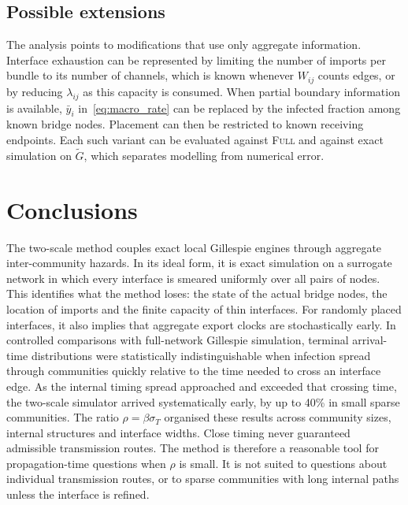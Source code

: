 \documentclass[a4paper,fleqn]{cas-sc}
\newcommand{\ibar}{\bar{y}}
\newcommand{\Full}{\textup{\textsc{Full}}}
\begin{document}
\subsection{Possible extensions}

The analysis points to modifications that use only aggregate information. Interface exhaustion can be represented by limiting the number of imports per bundle to its number of channels, which is known whenever $W_{ij}$ counts edges, or by reducing $\lambda_{ij}$ as this capacity is consumed. When partial boundary information is available, $\ibar_i$ in~\eqref{eq:macro_rate} can be replaced by the infected fraction among known bridge nodes. Placement can then be restricted to known receiving endpoints. Each such variant can be evaluated against \Full{} and against exact simulation on $\tilde G$, which separates modelling from numerical error.

\clearpage
\section{Conclusions}
\label{sec:conclusions}

The two-scale method couples exact local Gillespie engines through aggregate inter-community hazards. In its ideal form, it is exact simulation on a surrogate network in which every interface is smeared uniformly over all pairs of nodes. This identifies what the method loses: the state of the actual bridge nodes, the location of imports and the finite capacity of thin interfaces. For randomly placed interfaces, it also implies that aggregate export clocks are stochastically early. In controlled comparisons with full-network Gillespie simulation, terminal arrival-time distributions were statistically indistinguishable when infection spread through communities quickly relative to the time needed to cross an interface edge. As the internal timing spread approached and exceeded that crossing time, the two-scale simulator arrived systematically early, by up to 40\% in small sparse communities. The ratio $\rho=\beta\sigma_T$ organised these results across community sizes, internal structures and interface widths. Close timing never guaranteed admissible transmission routes. The method is therefore a reasonable tool for propagation-time questions when $\rho$ is small. It is not suited to questions about individual transmission routes, or to sparse communities with long internal paths unless the interface is refined.
\end{document}
